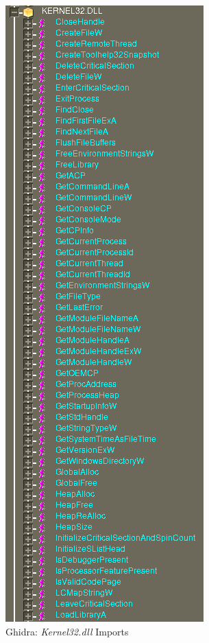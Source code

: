 \documentclass[10pt,a4paper]{article}
\begin{document}
\begin{figure}[!htbp]%
	\centering
	\includegraphics[width=\columnwidth]{pics/importsKernel32.png}
	\caption{Ghidra: \textit{Kernel32.dll} Imports}
	\label{importsKernel32}
\end{figure}
\end{document}
